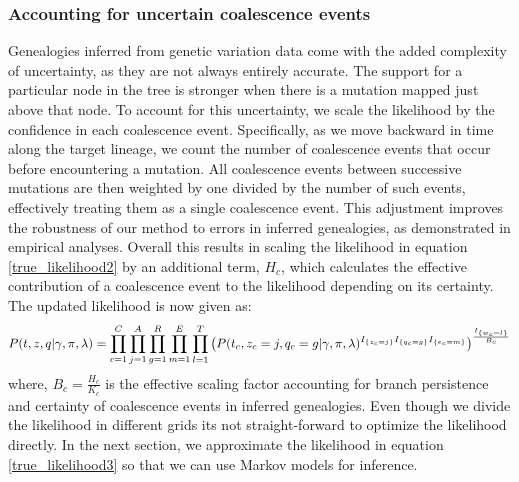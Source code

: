 \subsubsection{Accounting for uncertain coalescence events}

Genealogies inferred from genetic variation data come with the added complexity of uncertainty, as they are not always entirely accurate. The support for a particular node in the tree is stronger when there is a mutation mapped just above that node. To account for this uncertainty, we scale the likelihood by the confidence in each coalescence event. Specifically, as we move backward in time along the target lineage, we count the number of coalescence events that occur before encountering a mutation. All coalescence events between successive mutations are then weighted by one divided by the number of such events, effectively treating them as a single coalescence event. This adjustment improves the robustness of our method to errors in inferred genealogies, as demonstrated in empirical analyses. Overall this results in scaling the likelihood in equation \ref{true_likelihood2} by an additional term, $H_c$, which calculates the effective contribution of a coalescence event to the likelihood depending on its certainty. The updated likelihood is now given as: 
\begin{equation}
    \footnotesize
    P(t,z,q \vert \gamma, \pi, \lambda) = \prod_{c=1}^{C} \prod_{j = 1}^A \prod_{g =1}^{R} \prod_{m = 1}^E \prod_{l =1}^{T} \left( P(t_c,z_c = j,q_c=g \vert \gamma, \pi, \lambda)^{I_{\{z_c = j\}} I_{\{q_c = g\}} I_{\{e_c = m\}}} \right) ^{\frac{I_{\{w_c = l\}}}{B_c}}
\label{true_likelihood3}
\end{equation}
where, $B_c = \frac{H_c}{K_c}$ is the effective scaling factor accounting for branch persistence and certainty of coalescence events in inferred genealogies. Even though we divide the likelihood in different grids its not straight-forward to optimize the likelihood directly. In the next section, we approximate the likelihood in equation \ref{true_likelihood3} so that we can use Markov models for inference. 


